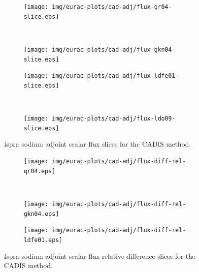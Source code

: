 \clearpage
\begin{figure}[!htb]
\begin{subfigure}{\textwidth}
\centering
\texttt{[image: img/eurac-plots/cad-adj/flux-qr04-slice.eps]}
\end{subfigure}
\\
\begin{subfigure}{\textwidth}
\centering
\texttt{[image: img/eurac-plots/cad-adj/flux-gkn04-slice.eps]}
\end{subfigure}
\end{figure}
\clearpage
\begin{figure}[!htb]
\ContinuedFloat
\begin{subfigure}{\textwidth}
\centering
\texttt{[image: img/eurac-plots/cad-adj/flux-ldfe01-slice.eps]}
\end{subfigure}
\\
\begin{subfigure}{\textwidth}
\centering
\texttt{[image: img/eurac-plots/cad-adj/flux-ldo09-slice.eps]}
\end{subfigure}
\caption{Ispra sodium adjoint scalar flux slices for the CADIS method.}
\label{eurac-cad-slices}
\end{figure}

\clearpage
\begin{figure}[!htb]
\begin{subfigure}{\textwidth}
\centering
\texttt{[image: img/eurac-plots/cad-adj/flux-diff-rel-qr04.eps]}
\end{subfigure}
\\
\begin{subfigure}{\textwidth}
\centering
\texttt{[image: img/eurac-plots/cad-adj/flux-diff-rel-gkn04.eps]}
\end{subfigure}
\end{figure}
\clearpage
\begin{figure}[!htb]
\ContinuedFloat
\begin{subfigure}{\textwidth}
\centering
\texttt{[image: img/eurac-plots/cad-adj/flux-diff-rel-ldfe01.eps]}
\end{subfigure}
\caption{Ispra sodium adjoint scalar flux relative difference slices for the CADIS 
         method.}
\label{eurac-cad-diff-rel}
\end{figure}

